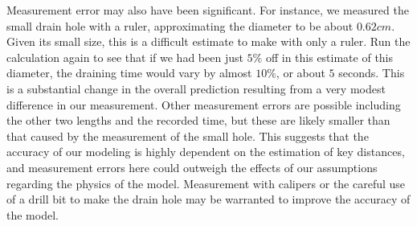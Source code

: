 \documentclass{ximera}
\begin{document}
\begin{enumerate}
    Measurement error may also have been significant.  For instance, we measured the small drain hole with a ruler, approximating the diameter to be about $0.62 cm$.  Given its small size, this is a difficult estimate to make with only a ruler.  Run the calculation again to see that if we had been just $5\%$ off in this estimate of this diameter, the draining time would vary by almost $10\%$, or about $5$ seconds.  This is a substantial change in the overall prediction resulting from a very modest difference in our measurement.  Other measurement errors are possible including the other two lengths and the recorded time, but these are likely smaller than that caused by the measurement of the small hole.  This suggests that the accuracy of our modeling is highly dependent on the estimation of key distances, and measurement errors here could outweigh the effects of our assumptions regarding the physics of the model.  Measurement with calipers or the careful use of a drill bit to make the drain hole may be warranted to improve the accuracy of the model.
\end{enumerate}
 
 
\end{document}
